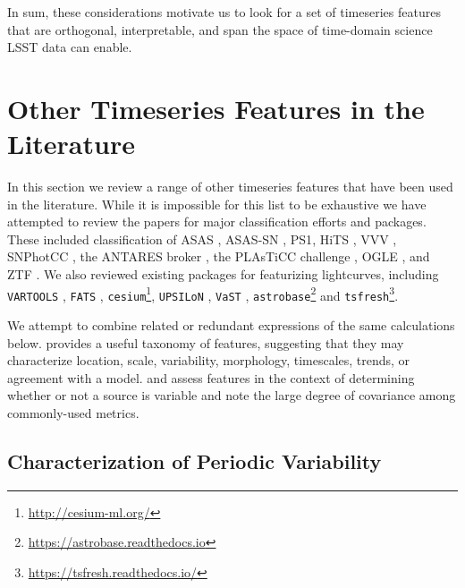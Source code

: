 \documentclass[DM,authoryear,toc]{lsstdoc}
\begin{document}
In sum, these considerations motivate us to look for a set of timeseries features that are orthogonal, interpretable, and span the space of time-domain science LSST data can enable.

\section{Other Timeseries Features in the Literature}

In this section we review a range of other timeseries features that have been used in the literature.
While it is impossible for this list to be exhaustive we have attempted to review the papers for major classification efforts and packages.
These included classification of ASAS \citep{Richards:12:ASASCatalog}, ASAS-SN \citep{Jayasinghe:18:ASASSNVarsI,Jayasinghe:19:ASASSNVarsII,Jayasinghe:19:ASASSNVarsIII,Jayasinghe:20:ASASSNVarsV}, PS1\citep{Hernitschek:16:PS1SF, Villar:20:SuperRAENN}, HiTS \citep{Martinez-Palomera:18:HiTS}, VVV \citep{Elorrieta:16:A-machine-learn}, SNPhotCC \citep{Kessler:10:SNPhotCC}, the ANTARES broker \citep{Narayan:18:ANTARES}, the PLAsTiCC challenge \citep{Malz:19:PLAsTiCC,Kessler:19:PlasticcModels, Boone:19:AvocadoClassifier}, OGLE \citep{Pashchenko:18:OGLEClassification}, and ZTF \citep{Sanchez-Saez:21:AlertClassification, tmp_Coughlin:20:ZTFClassification}.
We also reviewed existing packages for featurizing lightcurves, including \texttt{VARTOOLS} \citep{Hartman:16:VARTOOLS}, \texttt{FATS} \citep{Nun:15:FATS}, \texttt{cesium}\footnote{\url{http://cesium-ml.org/}}, \texttt{UPSILoN} \citep{Kim:16:UPSILoN}, \texttt{VaST} \citep{Sokolovsky:18:VaST}, \texttt{astrobase}\footnote{\url{https://astrobase.readthedocs.io}} and \texttt{tsfresh}\footnote{\url{https://tsfresh.readthedocs.io/}}.

We attempt to combine related or redundant expressions of the same calculations below.
\citet{Graham:17:VariableClassificationChallenges} provides a useful taxonomy of features, suggesting that they may characterize location, scale, variability, morphology, timescales, trends, or agreement with a model.
\citet{Sokolovsky:17:VariabilityDetection} and \citet{Pashchenko:18:OGLEClassification} assess features in the context of determining whether or not a source is variable and note the large degree of covariance among commonly-used metrics.




\subsection{Characterization of Periodic Variability}
\end{document}
